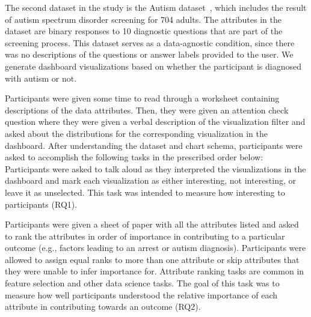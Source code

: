 \par The second dataset in the study is the Autism dataset~\cite{autism}, which includes the result of autism spectrum disorder screening for 704 adults. The attributes in the dataset are binary responses to 10 diagnostic questions that are part of the screening process. This dataset serves as a data-agnostic condition, since there was no descriptions of the questions or answer labels provided to the user. We generate dashboard visualizations based on whether the participant is diagnosed with autism or not.
\par Participants were given some time to read through a worksheet containing descriptions of the data attributes. Then, they were given an attention check question where they were given a verbal description of the visualization filter and asked about the distributions for the corresponding visualization in the dashboard. After understanding the dataset and chart schema, participants were asked to accomplish the following tasks in the prescribed order below:
 Participants were asked to talk aloud as they interpreted the visualizations in the dashboard and mark each visualization as either interesting, not interesting, or leave it as unselected. This task was intended to measure how interesting  to participants (RQ1).%

 Participants were given a sheet of paper with all the attributes listed and asked to rank the attributes in order of importance in contributing to a particular outcome (e.g., factors leading to an arrest or autism diagnosis). Participants were allowed to assign equal ranks to more than one attribute or skip attributes that they were unable to infer importance for. Attribute ranking tasks are common in feature selection and other data science tasks. The goal of this task was to measure how well participants understood the relative importance of each attribute in contributing towards an outcome (RQ2).

